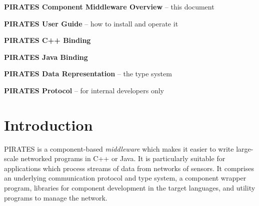 \documentclass[12pt,a4paper,twoside]{article}
\renewcommand{\_}{\texttt{\symbol{95}}}
\begin{document}
\begin{bulletlist}
\item \textbf{PIRATES Component Middleware Overview} -- this document
\item \textbf{PIRATES User Guide} -- how to install and operate it
\item \textbf{PIRATES C++ Binding}
\item \textbf{PIRATES Java Binding}
\item \textbf{PIRATES Data Representation} -- the type system
\item \textbf{PIRATES Protocol} -- for internal developers only
\end{bulletlist}

\newpage

\section{Introduction}

PIRATES is a component-based \textit{middleware} which makes it easier to
write large-scale
networked programs in C++ or Java. It is particularly suitable for
applications which process streams of data from networks of sensors.
It comprises an underlying communication protocol and type system,
a component wrapper program, libraries for component development in
the target languages, and utility programs to manage the network.
\end{document}
